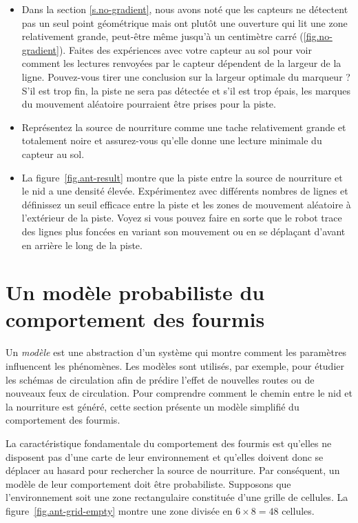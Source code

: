 \begin{framed}
\begin{itemize}
\item Dans la section \ref{s.no-gradient}, nous avons noté que les capteurs ne détectent pas un seul point géométrique mais ont plutôt une ouverture qui lit une zone relativement grande, peut-être même jusqu'à un centimètre carré (\ref{fig.no-gradient}). Faites des expériences avec votre capteur au sol pour voir comment les lectures renvoyées par le capteur dépendent de la largeur de la ligne. Pouvez-vous tirer une conclusion sur la largeur optimale du marqueur ? S'il est trop fin, la piste ne sera pas détectée et s'il est trop épais, les marques du mouvement aléatoire pourraient être prises pour la piste.
\item Représentez la source de nourriture comme une tache relativement grande et totalement noire et assurez-vous qu'elle donne une lecture minimale du capteur au sol.
\item La figure~\ref{fig.ant-result} montre que la piste entre la source de nourriture et le nid a une densité élevée. Expérimentez avec différents nombres de lignes et définissez un seuil efficace entre la piste et les zones de mouvement aléatoire à l'extérieur de la piste. Voyez si vous pouvez faire en sorte que le robot trace des lignes plus foncées en variant son mouvement ou en se déplaçant d'avant en arrière le long de la piste.
\end{itemize}
\end{framed}


\section[Un modèle probabiliste]{Un modèle probabiliste du comportement des fourmis}\label{s.ant-probabilistic}

Un \emph{modèle} est une abstraction d'un système qui montre comment les paramètres influencent les phénomènes. Les modèles sont utilisés, par exemple, pour étudier les schémas de circulation afin de prédire l'effet de nouvelles routes ou de nouveaux feux de circulation. Pour comprendre comment le chemin entre le nid et la nourriture est généré, cette section présente un modèle simplifié du comportement des fourmis. 

La caractéristique fondamentale du comportement des fourmis est qu'elles ne disposent pas d'une carte de leur environnement et qu'elles doivent donc se déplacer au hasard pour rechercher la source de nourriture. Par conséquent, un modèle de leur comportement doit être probabiliste. Supposons que l'environnement soit une zone rectangulaire constituée d'une grille de cellules. La figure~\ref{fig.ant-grid-empty} montre une zone divisée en $6\times 8=48$ cellules.


